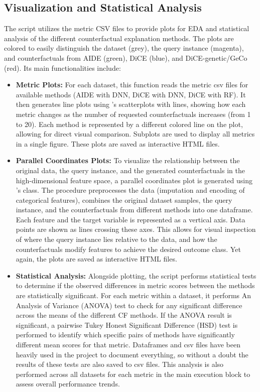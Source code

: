 \subsection{Visualization and Statistical Analysis}
The  script utilizes the metric CSV files to provide plots for EDA and statistical analysis of the different counterfactual explanation methods. The plots are colored to easily distinguish the dataset (grey), the query instance (magenta), and counterfactuals from AIDE (green), DiCE (blue), and DiCE-genetic/GeCo (red). Its main functionalities include:

\begin{itemize}
    \item \textbf{Metric Plots:} For each dataset, this function reads the metric csv files for available methods (AIDE with DNN, DiCE with DNN, DiCE with RF). It then generates line plots using 's scatterplots with lines, showing how each metric changes as the number of requested counterfactuals increases (from 1 to 20). Each method is represented by a different colored line on the plot, allowing for direct visual comparison. Subplots are used to display all metrics in a single figure. These plots are saved as interactive HTML files.

    \item \textbf{Parallel Coordinates Plots:} To visualize the relationship between the original data, the query instance, and the generated counterfactuals in the high-dimensional feature space, a parallel coordinates plot is generated using 's  class. The procedure preprocesses the data (imputation and encoding of categorical features), combines the original dataset samples, the query instance, and the counterfactuals from different methods into one dataframe. Each feature and the target variable is represented as a vertical axis. Data points are shown as lines crossing these axes. This allows for visual inspection of where the query instance lies relative to the data, and how the counterfactuals modify features to achieve the desired outcome class. Yet again, the plots are saved as interactive HTML files.
    \item \textbf{Statistical Analysis:} Alongside plotting, the script performs statistical tests to determine if the observed differences in metric scores between the methods are statistically significant. For each metric within a dataset, it performs
    An Analysis of Variance (ANOVA) test to check for any significant difference across the means of the different CF methods. If the ANOVA result is significant, a pairwise Tukey Honest Significant Difference (HSD) test is performed to identify which specific pairs of methods have significantly different mean scores for that metric. Dataframes and csv files have been heavily used in the project to document everything, so without a doubt the results of these tests are also saved to csv files. This analysis is also performed across all datasets for each metric in the main execution block to assess overall performance trends.
\end{itemize}